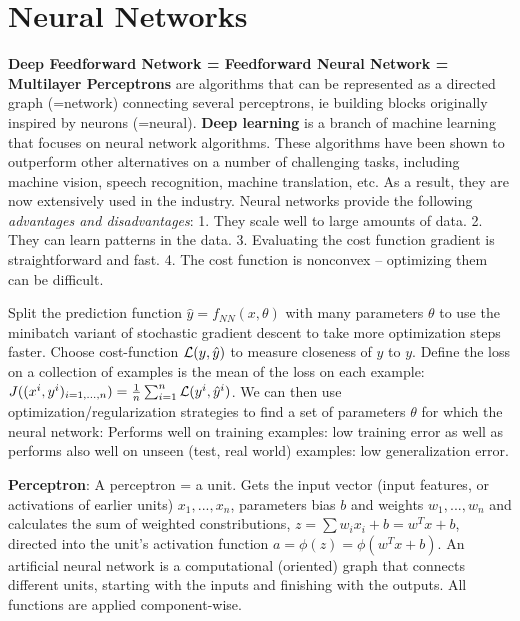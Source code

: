 \section*{Neural Networks}
\textbf{Deep Feedforward Network = Feedforward Neural Network = Multilayer Perceptrons} are algorithms that can be represented as a directed graph (=network) connecting several perceptrons, ie building blocks originally inspired by neurons (=neural).
\textbf{Deep learning} is a branch of machine learning that focuses on neural network algorithms.
These algorithms have been shown to outperform other alternatives on a number of challenging tasks, including machine vision, speech recognition, machine translation, etc. As a result, they are now extensively used in the industry.
Neural networks provide the following \textit{advantages and disadvantages}: 1. They scale well to large amounts of data.
2. They can learn patterns in the data.
3. Evaluating the cost function gradient is straightforward and fast.
4. The cost function is nonconvex – optimizing them can be difficult.

Split the prediction function $\hat{y}=f_{NN} (x,\theta)$ with many parameters $\theta$ to use the minibatch variant of stochastic gradient descent to take more optimization steps faster.
Choose cost-function $\mathcal{L}(y,\hat{y})$ to measure closeness of $\hat{y}$ to $y$. 
Define the loss on a collection of examples is the mean of the loss on each example: $J((x^i, y^i)_{i=1,...,n})=\frac{1}{n} \sum_{i=1}^n \mathcal{L}(y^i, \hat{y}^i)$.
We can then use optimization/regularization strategies to find a set of parameters $\theta$ for which the neural network: Performs well on training examples: low training error as well as performs also well on unseen (test, real world) examples: low generalization error.

\textbf{Perceptron}: A perceptron = a unit. Gets the input vector (input features, or activations of earlier units) $x_1,...,x_n$, parameters bias $b$ and weights $w_1,...,w_n$ and calculates the sum of weighted constributions, $z=\sum w_i x_i + b = w^T x + b$, directed into the unit's activation function $a = \phi (z) = \phi (w^T x + b)$.
An artificial neural network is a computational (oriented) graph that connects different units, starting with the inputs and finishing with the outputs.
All functions are applied component-wise.

